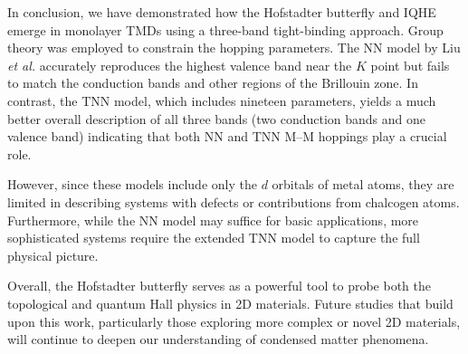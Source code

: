 In conclusion, we have demonstrated how the Hofstadter butterfly and \ac{IQHE} emerge in monolayer TMDs using a three-band tight-binding approach. Group theory was employed to constrain the hopping parameters. The \ac{NN} model by Liu \textit{et al.} accurately reproduces the highest valence band near the $K$ point but fails to match the conduction bands and other regions of the Brillouin zone. In contrast, the \ac{TNN} model, which includes nineteen parameters, yields a much better overall description of all three bands (two conduction bands and one valence band) indicating that both \ac{NN} and \ac{TNN} M--M hoppings play a crucial role.

However, since these models include only the $d$ orbitals of metal atoms, they are limited in describing systems with defects or contributions from chalcogen atoms. Furthermore, while the NN model may suffice for basic applications, more sophisticated systems require the extended TNN model to capture the full physical picture.

Overall, the Hofstadter butterfly serves as a powerful tool to probe both the topological and quantum Hall physics in 2D materials. Future studies that build upon this work, particularly those exploring more complex or novel 2D materials, will continue to deepen our understanding of condensed matter phenomena.



